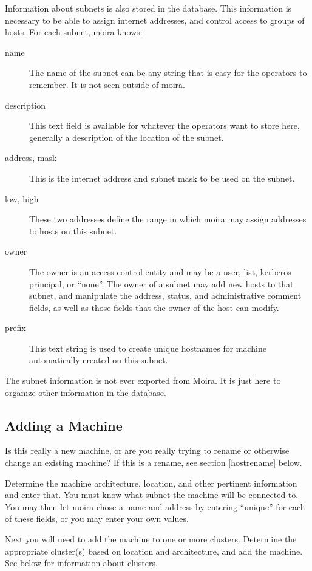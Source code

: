 Information about subnets is also stored in the database.  This
information is necessary to be able to assign internet addresses, and
control access to groups of hosts.  For each subnet, moira knows:
\begin{description}
\item[name] The name of the subnet can be any string that is easy for
the operators to remember.  It is not seen outside of moira.
\item[description] This text field is available for whatever the
operators want to store here, generally a description of the location
of the subnet.
\item[address, mask] This is the internet address and subnet mask to
be used on the subnet.
\item[low, high] These two addresses define the range in which moira
may assign addresses to hosts on this subnet.
\item[owner] The owner is an access control entity and may be a user,
list, kerberos principal, or ``none''.  The owner of a subnet may add
new hosts to that subnet, and manipulate the address, status,
and administrative comment fields, as well as those fields that the
owner of the host can modify.
\item[prefix] This text string is used to create unique hostnames for
machine automatically created on this subnet.
\end{description}
The subnet information is not ever exported from Moira.  It is just
here to organize other information in the database.

\subsection{Adding a Machine}

Is this really a new machine, or are you really trying to rename or
otherwise change an existing machine?  If this is a rename, see
section \ref{hostrename} below.

Determine the machine architecture, location, and other pertinent
information and enter that.  You must know what subnet the machine
will be connected to.  You may then let moira chose a name and address
by entering ``unique'' for each of these fields, or you may enter your
own values.

Next you will need to add the machine to one or more clusters.
Determine the appropriate cluster(s) based on location and
architecture, and add the machine.  See below for information about
clusters.

